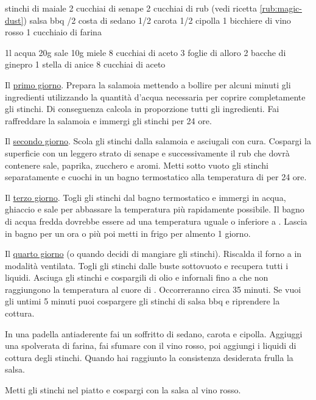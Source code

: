 \cbt
\begin{ingreds}
	 stinchi di maiale
	2 cucchiai di senape
	2 cucchiai di rub (vedi ricetta \ref{rub:magic-dust})
	salsa bbq
	/2 costa di sedano
	1/2 carota
	1/2 cipolla
	1 bicchiere di vino rosso
	1 cucchiaio di farina

\columnbreak
	1l acqua
	20g sale
	10g miele
	8 cucchiai di aceto
	3 foglie di alloro
	2 bacche di ginepro
	1 stella di anice
	8 cucchiai di aceto
\end{ingreds}

\begin{method}
Il \underline{primo giorno}. Prepara la salamoia mettendo a bollire per alcuni minuti gli ingredienti utilizzando la quantità d'acqua necessaria per coprire completamente gli stinchi. Di conseguenza calcola in proporzione tutti gli ingredienti. Fai raffreddare la salamoia e immergi gli stinchi per 24 ore.

Il \underline{secondo giorno}. Scola gli stinchi dalla salamoia e asciugali con cura. Cospargi la superficie con un leggero strato di senape e successivamente il rub che dovrà contenere sale, paprika, zucchero e aromi. Metti sotto vuoto gli stinchi separatamente e cuochi in un bagno termostatico alla temperatura di  per 24 ore.

Il \underline{terzo giorno}. Togli gli stinchi dal bagno termostatico e immergi in acqua, ghiaccio e sale per abbassare la temperatura più rapidamente possibile. Il bagno di acqua fredda dovrebbe essere ad una temperatura uguale o inferiore a . Lascia in bagno per un ora o più poi metti in frigo per almento 1 giorno.

Il \underline{quarto giorno} (o quando decidi di mangiare gli stinchi). Riscalda il forno a  in modalità ventilata. Togli gli stinchi dalle buste sottovuoto e recupera tutti i liquidi. Asciuga gli stinchi e cospargili di olio e infornali fino a che non raggiungono la temperatura al cuore di . Occorreranno circa 35 minuti. Se vuoi gli untimi 5 minuti puoi cospargere gli stinchi di salsa bbq e riprendere la cottura.

In una padella antiaderente fai un soffritto di sedano, carota e cipolla. Aggiuggi una spolverata di farina, fai sfumare con il vino rosso, poi aggiungi i liquidi di cottura degli stinchi. Quando hai raggiunto la consistenza desiderata frulla la salsa.

Metti gli stinchi nel piatto e cospargi con la salsa al vino rosso.
\end {method}



